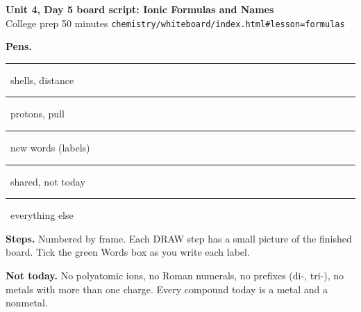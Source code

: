 \documentclass[10.5pt]{article}
\newcommand{\pen}[2]{\textcolor{#1}{\rule{8pt}{8pt}}\ #2}
\begin{document}
\begin{center}{\Large\bfseries Unit 4, Day 5 board script: Ionic Formulas and Names}\\[2pt]{\normalsize College prep \textbullet{} 50 minutes \textbullet{} \texttt{chemistry/whiteboard/index.html\#lesson=formulas}}\end{center}
\noindent\textbf{Pens.} \pen{pblue}{shells, distance} \quad \pen{pred}{protons, pull} \quad \pen{pgreen}{new words (labels)} \quad \pen{ppurple}{shared, not today} \quad \pen{black}{everything else}\par
\noindent\textbf{Steps.} Numbered by frame. Each DRAW step has a small picture of the finished board. Tick the green Words box as you write each label.\par
\noindent\textbf{Not today.} No polyatomic ions, no Roman numerals, no prefixes (di-, tri-), no metals with more than one charge. Every compound today is a metal and a nonmetal.\par\smallskip
\noindent{}\par\medskip
\end{document}

